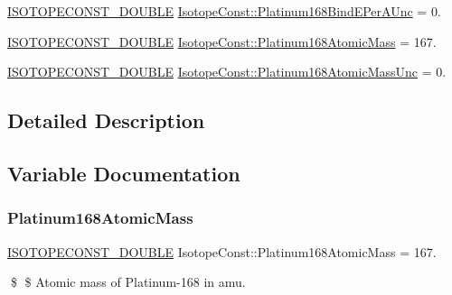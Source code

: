 \begin{DoxyCompactItemize}
\mbox{\hyperlink{group___isotope_const-_macros_ga8f45a7272ce02c0b4c65c44636ed719a}{I\+S\+O\+T\+O\+P\+E\+C\+O\+N\+S\+T\+\_\+\+D\+O\+U\+B\+LE}} \mbox{\hyperlink{group___isotope_const-_platinum-_pt168_ga9eb809306f7cbec476fd9466c0bf9619}{Isotope\+Const\+::\+Platinum168\+Bind\+E\+Per\+A\+Unc}} = 0.
\item 
\mbox{\hyperlink{group___isotope_const-_macros_ga8f45a7272ce02c0b4c65c44636ed719a}{I\+S\+O\+T\+O\+P\+E\+C\+O\+N\+S\+T\+\_\+\+D\+O\+U\+B\+LE}} \mbox{\hyperlink{group___isotope_const-_platinum-_pt168_ga68143829544f97ec5fb8d3c772e111f4}{Isotope\+Const\+::\+Platinum168\+Atomic\+Mass}} = 167.
\item 
\mbox{\hyperlink{group___isotope_const-_macros_ga8f45a7272ce02c0b4c65c44636ed719a}{I\+S\+O\+T\+O\+P\+E\+C\+O\+N\+S\+T\+\_\+\+D\+O\+U\+B\+LE}} \mbox{\hyperlink{group___isotope_const-_platinum-_pt168_ga9fce3e7991b06b2202491064a316b15d}{Isotope\+Const\+::\+Platinum168\+Atomic\+Mass\+Unc}} = 0.
\end{DoxyCompactItemize}


\subsection{Detailed Description}


\subsection{Variable Documentation}
\mbox{\label{group___isotope_const-_platinum-_pt168_ga68143829544f97ec5fb8d3c772e111f4}} 
\subsubsection{\texorpdfstring{Platinum168\+Atomic\+Mass}{Platinum168AtomicMass}}
{\footnotesize\ttfamily \mbox{\hyperlink{group___isotope_const-_macros_ga8f45a7272ce02c0b4c65c44636ed719a}{I\+S\+O\+T\+O\+P\+E\+C\+O\+N\+S\+T\+\_\+\+D\+O\+U\+B\+LE}} Isotope\+Const\+::\+Platinum168\+Atomic\+Mass = 167.}

\$ \$ Atomic mass of Platinum-\/168 in amu. \mbox{\label{group___isotope_const-_platinum-_pt168_ga9fce3e7991b06b2202491064a316b15d}} 
